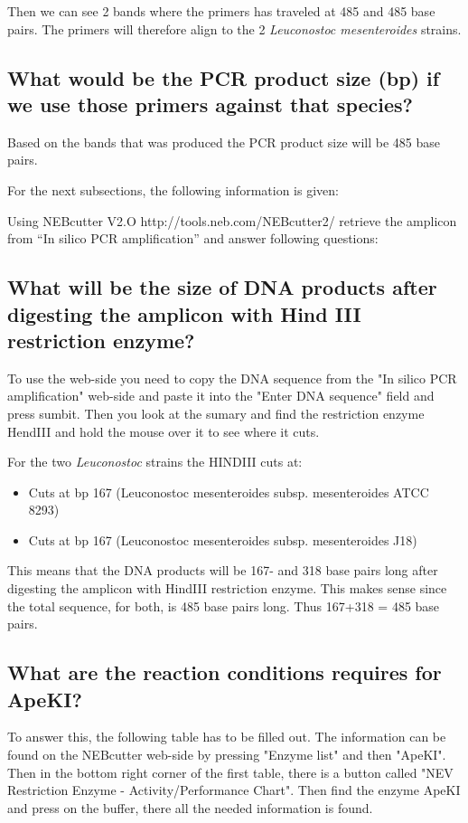 Then we can see 2 bands where the primers has traveled at 485 and 485 base pairs. The primers will therefore align to the 2 \textit{Leuconostoc mesenteroides} strains.

\subsection{What would be the PCR product size (bp) if we use those primers against that species?}
Based on the bands that was produced the PCR product size will be 485 base pairs.

\vspace{3em}
For the next subsections, the following information is given:

Using NEBcutter V2.O  http://tools.neb.com/NEBcutter2/ retrieve the amplicon from “In silico PCR amplification” and answer following questions:

\subsection{What will be the size of DNA products after digesting the amplicon with Hind III restriction enzyme?}
To use the web-side you need to copy the DNA sequence from the "In silico PCR amplification" web-side and paste it into the "Enter DNA sequence" field and press sumbit. Then you look at the sumary and find the restriction enzyme HendIII and hold the mouse over it to see where it cuts. 

\vspace{1em}
For the two \textit{Leuconostoc} strains the HINDIII cuts at:
\begin{itemize}
    \item Cuts at bp 167 (Leuconostoc mesenteroides subsp. mesenteroides ATCC 8293)
    \item Cuts at bp 167 (Leuconostoc mesenteroides subsp. mesenteroides J18)
\end{itemize}

\vspace{1em}
This means that the DNA products will be 167- and 318 base pairs long after digesting the amplicon with HindIII restriction enzyme. This makes sense since the total sequence, for both, is 485 base pairs long. Thus 167+318 = 485 base pairs.

\subsection{What are the reaction conditions requires for ApeKI?}
To answer this, the following table has to be filled out. The information can be found on the NEBcutter web-side by pressing "Enzyme list" and then "ApeKI". Then in the bottom right corner of the first table, there is a button called "NEV Restriction Enzyme - Activity/Performance Chart". Then find the enzyme ApeKI and press on the buffer, there all the needed information is found. 

